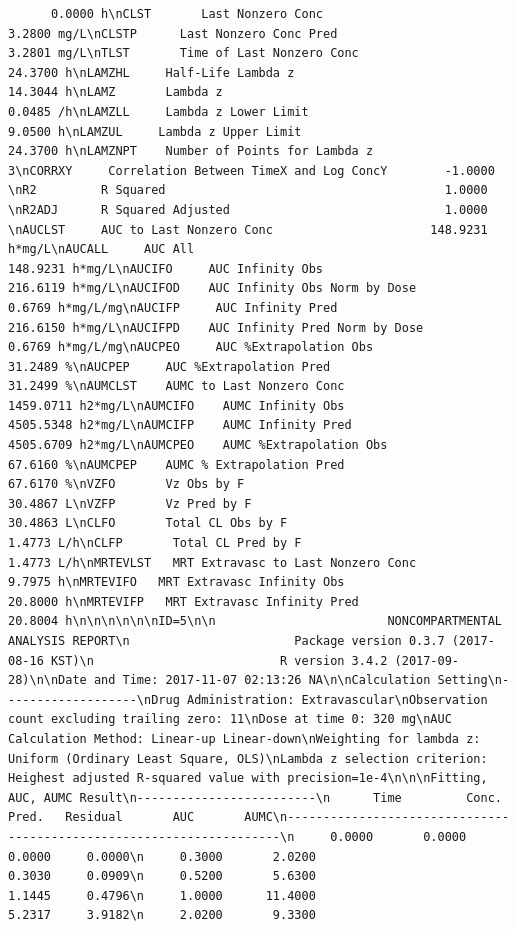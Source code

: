 \documentclass[12pt,]{krantz}
\theoremstyle{definition}
\theoremstyle{definition}
\theoremstyle{definition}
\theoremstyle{remark}
\begin{document}
\begin{verbatim}
      0.0000 h\nCLST       Last Nonzero Conc                               3.2800 mg/L\nCLSTP      Last Nonzero Conc Pred                          3.2801 mg/L\nTLST       Time of Last Nonzero Conc                      24.3700 h\nLAMZHL     Half-Life Lambda z                             14.3044 h\nLAMZ       Lambda z                                        0.0485 /h\nLAMZLL     Lambda z Lower Limit                            9.0500 h\nLAMZUL     Lambda z Upper Limit                           24.3700 h\nLAMZNPT    Number of Points for Lambda z                   3\nCORRXY     Correlation Between TimeX and Log ConcY        -1.0000 \nR2         R Squared                                       1.0000 \nR2ADJ      R Squared Adjusted                              1.0000 \nAUCLST     AUC to Last Nonzero Conc                      148.9231 h*mg/L\nAUCALL     AUC All                                       148.9231 h*mg/L\nAUCIFO     AUC Infinity Obs                              216.6119 h*mg/L\nAUCIFOD    AUC Infinity Obs Norm by Dose                   0.6769 h*mg/L/mg\nAUCIFP     AUC Infinity Pred                             216.6150 h*mg/L\nAUCIFPD    AUC Infinity Pred Norm by Dose                  0.6769 h*mg/L/mg\nAUCPEO     AUC %Extrapolation Obs                         31.2489 %\nAUCPEP     AUC %Extrapolation Pred                        31.2499 %\nAUMCLST    AUMC to Last Nonzero Conc                    1459.0711 h2*mg/L\nAUMCIFO    AUMC Infinity Obs                            4505.5348 h2*mg/L\nAUMCIFP    AUMC Infinity Pred                           4505.6709 h2*mg/L\nAUMCPEO    AUMC %Extrapolation Obs                        67.6160 %\nAUMCPEP    AUMC % Extrapolation Pred                      67.6170 %\nVZFO       Vz Obs by F                                    30.4867 L\nVZFP       Vz Pred by F                                   30.4863 L\nCLFO       Total CL Obs by F                               1.4773 L/h\nCLFP       Total CL Pred by F                              1.4773 L/h\nMRTEVLST   MRT Extravasc to Last Nonzero Conc              9.7975 h\nMRTEVIFO   MRT Extravasc Infinity Obs                     20.8000 h\nMRTEVIFP   MRT Extravasc Infinity Pred                    20.8004 h\n\n\n\n\n\nID=5\n\n                        NONCOMPARTMENTAL ANALYSIS REPORT\n                       Package version 0.3.7 (2017-08-16 KST)\n                          R version 3.4.2 (2017-09-28)\n\nDate and Time: 2017-11-07 02:13:26 NA\n\nCalculation Setting\n-------------------\nDrug Administration: Extravascular\nObservation count excluding trailing zero: 11\nDose at time 0: 320 mg\nAUC Calculation Method: Linear-up Linear-down\nWeighting for lambda z: Uniform (Ordinary Least Square, OLS)\nLambda z selection criterion: Heighest adjusted R-squared value with precision=1e-4\n\n\nFitting, AUC, AUMC Result\n-------------------------\n      Time         Conc.      Pred.   Residual       AUC       AUMC\n---------------------------------------------------------------------\n     0.0000       0.0000                           0.0000     0.0000\n     0.3000       2.0200                           0.3030     0.0909\n     0.5200       5.6300                           1.1445     0.4796\n     1.0000      11.4000                           5.2317     3.9182\n     2.0200       9.3300                          
\end{verbatim}
\end{document}
